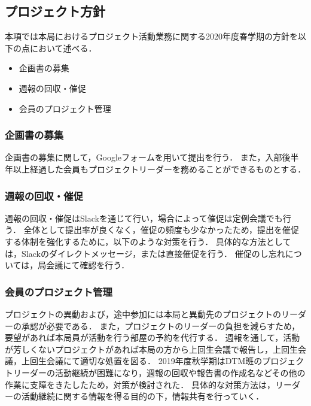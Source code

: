 ﻿\subsection*{プロジェクト方針}


本項では本局におけるプロジェクト活動業務に関する2020年度春学期の方針を以下の点において述べる．

\begin{itemize}
\item 企画書の募集
\item 週報の回収・催促
\item 会員のプロジェクト管理
\end{itemize}

\subsubsection*{企画書の募集}

企画書の募集に関して，Googleフォームを用いて提出を行う．
また，入部後半年以上経過した会員もプロジェクトリーダーを務めることができるものとする．


\subsubsection*{週報の回収・催促}

週報の回収・催促はSlackを通じて行い，場合によって催促は定例会議でも行う．
全体として提出率が良くなく，催促の頻度も少なかったため，提出を催促する体制を強化するために，以下のような対策を行う．
具体的な方法としては，Slackのダイレクトメッセージ，または直接催促を行う．
催促のし忘れについては，局会議にて確認を行う．

\subsubsection*{会員のプロジェクト管理}

プロジェクトの異動および，途中参加には本局と異動先のプロジェクトのリーダーの承認が必要である．
また，プロジェクトのリーダーの負担を減らすため，要望があれば本局員が活動を行う部屋の予約を代行する．
週報を通して，活動が芳しくないプロジェクトがあれば本局の方から上回生会議で報告し，上回生会議，上回生会議にて適切な処置を図る．
2019年度秋学期はDTM班のプロジェクトリーダーの活動継続が困難になり，週報の回収や報告書の作成名などその他の作業に支障をきたしたため，対策が検討された．
具体的な対策方法は，リーダーの活動継続に関する情報を得る目的の下，情報共有を行っていく．

